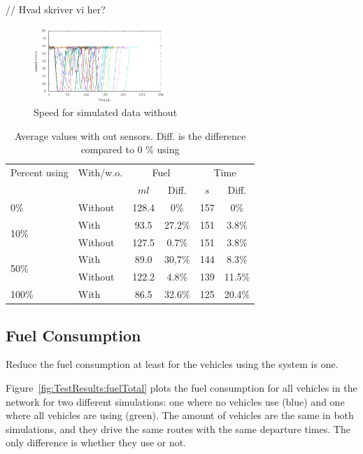 // Hvad skriver vi her?

\begin{figure}[htb]
\includegraphics[width=0.45\textwidth]{../images/tp0c0_8/speedUncontrolled0.png}
\caption{Speed for simulated data without \tech}
\label{fig:TestResults:speed0}
\end{figure}

\begin{table}
\centering
\begin{tabular}{|l|l|cc|cc|}\hline
Percent using 			& With/w.o. & \multicolumn{2}{c|}{Fuel} 	& \multicolumn{2}{c|}{Time}\\
\tech					&\tech		& $ml$		& Diff.			&	$s$	& Diff.\\\hline
\multirow{1}{*}{0\%}	& Without	&	128.4	&	0\%			&	157 & 0\%		\\\hline
\multirow{2}{*}{10\%}	& With 		&	93.5	&	27.2\%		&	151 & 3.8\%		\\
						& Without 	&	127.5	&	0.7\%		&	151 & 3.8\%		\\\hline
\multirow{2}{*}{50\%}	& With		&	89.0	&	30,7\%		&	144 & 8.3\%		\\
						& Without	&	122.2	&	4.8\%		&	139 & 11.5\%		\\\hline
\multirow{1}{*}{100\%}	& With		&	86.5	&	32.6\%		&	125 & 20.4\%	\\\hline
\end{tabular}
\caption{Average values with out sensors. Diff. is the difference compared to 0 \% using \tech}
\label{tb:TestResults:total}
\end{table}

\subsection{Fuel Consumption}
Reduce the fuel consumption at least for the vehicles using the system is one. 

Figure~\ref{fig:TestResults:fuelTotal} plots the fuel consumption for all vehicles in the network for two different simulations: one where no vehicles use \tech (blue) and one where all vehicles are using \tech (green).
The amount of vehicles are the same in both simulations, and they drive the same routes with the same departure times. 
The only difference is whether they use \tech or not.

